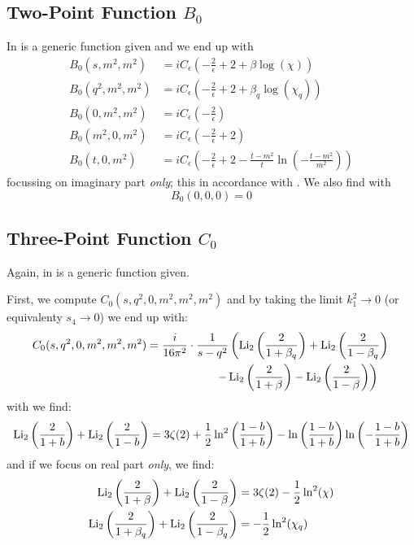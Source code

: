 \subsection[Two-Point Function B0]{Two-Point Function $B_0$}
In \cite[eq. (4.23)]{Denner:1991kt} is a generic function given and we end up with
\begin{align}
B_0(s,m^2,m^2) &= iC_\epsilon \left(-\frac 2 \epsilon+2+\beta\log(\chi)\right)\\
B_0(q^2,m^2,m^2) &= iC_\epsilon \left(-\frac 2 \epsilon+2+\beta_q\log(\chi_q)\right)\\
B_0(0,m^2,m^2) &= iC_\epsilon \left(-\frac 2 \epsilon\right)\\
B_0(m^2,0,m^2) &= iC_\epsilon \left(-\frac 2 \epsilon+2\right)\\
B_0(t,0,m^2) &= iC_\epsilon \left(-\frac 2 \epsilon+2-\frac{t-m^2}{t}\ln\left(-\frac{t-m^2}{m^2}\right)\right)
\end{align}
focussing on imaginary part \textit{only}; this in accordance with \cite{Bojak:2000eu}\cite{PhysRevD.40.54}. We also find with \cite{Bojak:2000eu}
\begin{equation}
B_0(0,0,0)=0
\end{equation}

\subsection[Three-Point Function C0]{Three-Point Function $C_0$}
Again, in \cite[eq. (4.26)]{Denner:1991kt} is a generic function given.

First, we compute $C_0(s,q^2,0,m^2,m^2,m^2)$ and by taking the limit $k_1^2\rightarrow 0$ (or equivalenty $s_4\rightarrow 0$) we end up with:
\begin{align}
C_0(s,q^2,0,m^2,m^2,m^2)&=\frac{i}{16\pi^2}\cdot\frac 1{s-q^2}\left(\operatorname{\text{Li}_2}\left(\frac 2 {1+\beta_q}\right)+\operatorname{\text{Li}_2}\left(\frac 2 {1-\beta_q}\right)\right.\nonumber\\
&\hspace{60pt}\left.-\operatorname{\text{Li}_2}\left(\frac 2 {1+\beta}\right)-\operatorname{\text{Li}_2}\left(\frac 2 {1-\beta}\right)\right)
\end{align}
with \cite{Zagier2007} we find:
\begin{equation}
\operatorname{\text{Li}_2}\left(\frac 2 {1+b}\right)+\operatorname{\text{Li}_2}\left(\frac 2 {1-b}\right) =3\zeta(2)+\frac 1 2\ln^2\left(\frac{1-b}{1+b}\right)-\ln\left(\frac{1-b}{1+b}\right)\ln\left(-\frac{1-b}{1+b}\right)
\end{equation}
and if we focus on real part \textit{only}, we find:
\begin{align}
\operatorname{\text{Li}_2}\left(\frac 2 {1+\beta}\right)+\operatorname{\text{Li}_2}\left(\frac 2 {1-\beta}\right) &=3\zeta(2)-\frac 1 2\ln^2(\chi)\\
\operatorname{\text{Li}_2}\left(\frac 2 {1+\beta_q}\right)+\operatorname{\text{Li}_2}\left(\frac 2 {1-\beta_q}\right) &=-\frac 1 2\ln^2(\chi_q)
\end{align}

